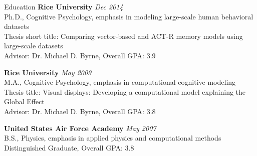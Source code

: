  
\begin{rSection}{Education}
  {\bf Rice University} \hfill {\em Dec 2014} \\
  Ph.D., Cognitive Psychology, emphasis in modeling large-scale human behavioral datasets \\
  Thesis short title: Comparing vector-based and ACT-R memory models using large-scale datasets \\
  Advisor: Dr. Michael D. Byrne, Overall GPA: 3.9
\item {\bf Rice University} \hfill {\em May 2009} \\ 
  M.A., Cognitive Psychology, emphasis in computational cognitive modeling \\
  Thesis title: Visual displays: Developing a computational model explaining the Global Effect \\
  Advisor: Dr. Michael D. Byrne, Overall GPA: 3.8
\item {\bf United States Air Force Academy} \hfill {\em May 2007} \\ 
  B.S., Physics, emphasis in applied physics and computational methods \\
  Distinguished Graduate, Overall GPA: 3.8 
\end{rSection}

